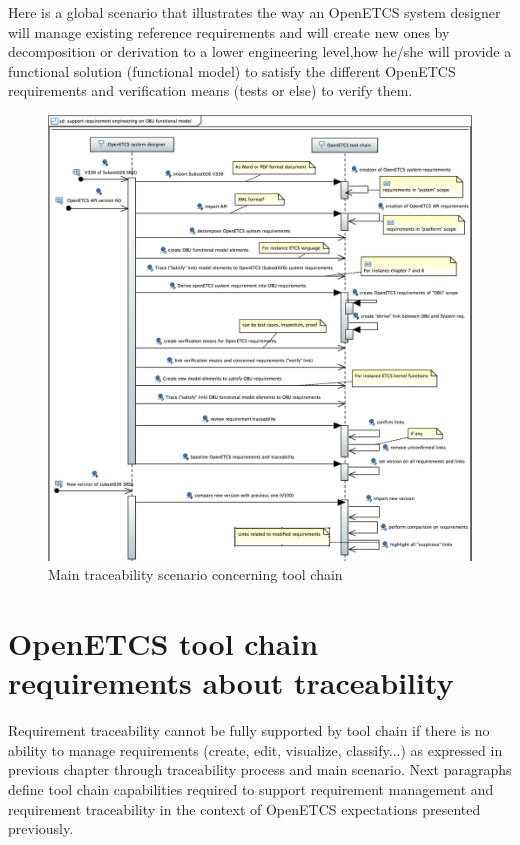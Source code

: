 \documentclass[11pt]{template/openetcs_report}
\begin{document}
Here is a global scenario that illustrates the way an OpenETCS system designer will manage existing reference requirements and will create new ones by decomposition or derivation to a lower engineering level,how he/she will provide a functional solution (functional model) to satisfy the different OpenETCS requirements and verification means (tests or else) to verify them.
\begin{figure}[htb]
\centering
\includegraphics[width=1.0\linewidth]{./images/ToolChainTraceabilityMainScenario.png}
\caption{\label{fig:toolChainTraceabilityMainScenario}Main traceability scenario concerning tool chain }
\end{figure}




\chapter{OpenETCS tool chain requirements about traceability}
\label{sec-3} 
Requirement traceability cannot be fully supported by tool chain if there is no ability to manage requirements (create, edit, visualize, classify...) as expressed in previous chapter through traceability process and main scenario.
Next paragraphs define tool chain capabilities required to support requirement management and requirement traceability in the context of OpenETCS expectations presented previously.
\end{document}
